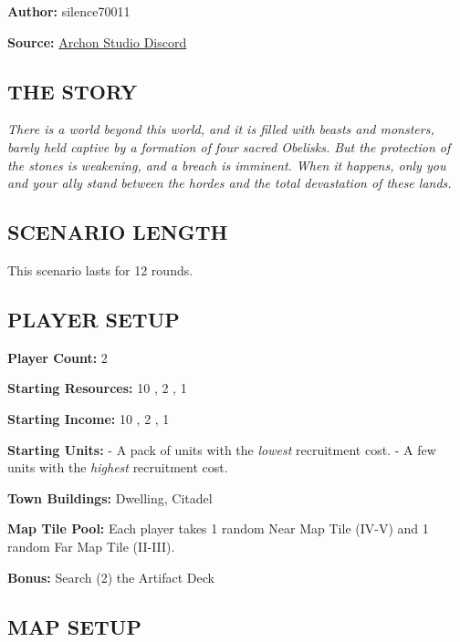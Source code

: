 
\begin{multicols*}{2}

\textbf{Author:} silence70011

\textbf{Source:} \href{https://discord.com/channels/740870068178649108/1233112440322002964/1233112440322002964}{Archon Studio Discord}

\subsection*{\MakeUppercase{The Story}}

\textit{There is a world beyond this world, and it is filled with beasts and monsters, barely held captive by a formation of four sacred Obelisks.
  But the protection of the stones is weakening, and a breach is imminent.
  When it happens, only you and your ally stand between the hordes and the total devastation of these lands.
}

\subsection*{\MakeUppercase{Scenario length}}

This scenario lasts for 12 rounds.

\subsection*{\MakeUppercase{Player Setup}}

\textbf{Player Count:} 2

\textbf{Starting Resources:} 10 , 2 , 1 

\textbf{Starting Income:} 10 , 2 , 1 

\textbf{Starting Units:}
- A pack of  units with the \textit{lowest} recruitment cost.
- A few  units with the \textit{highest} recruitment cost.

\textbf{Town Buildings:}  Dwelling, Citadel

\textbf{Map Tile Pool:} Each player takes 1 random Near Map Tile (IV-V) and 1 random Far Map Tile (II-III).

\textbf{Bonus:} Search (2) the Artifact Deck

\subsection*{\MakeUppercase{Map Setup}}


\end{multicols*}
